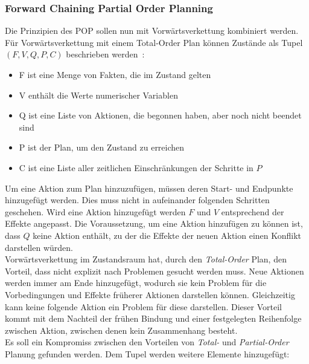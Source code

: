 \subsubsection{Forward Chaining Partial Order Planning}
Die Prinzipien des \ac{POP} sollen nun mit Vorwärtsverkettung kombiniert werden.
Für Vorwärtsverkettung mit einem Total-Order Plan können Zustände als Tupel $(F,V,Q,P,C)$ beschrieben werden~\citep{popf}:
\begin{itemize}
    \item F ist eine Menge von Fakten, die im Zustand gelten
    \item V enthält die Werte numerischer Variablen
    \item Q ist eine Liste von Aktionen, die begonnen haben, aber noch nicht beendet sind
    \item P ist der Plan, um den Zustand zu erreichen
    \item C ist eine Liste aller zeitlichen Einschränkungen der Schritte in $P$
\end{itemize}
Um eine Aktion zum Plan hinzuzufügen, müssen deren Start- und Endpunkte hinzugefügt werden.
Dies muss nicht in aufeinander folgenden Schritten geschehen.
Wird eine Aktion hinzugefügt werden $F$ und $V$ entsprechend der Effekte angepasst.
Die Voraussetzung, um eine Aktion hinzufügen zu können ist, dass $Q$ keine Aktion enthält, zu der die Effekte der neuen Aktion einen Konflikt darstellen würden.\\
Vorwärtsverkettung im Zustandsraum hat, durch den \emph{Total-Order} Plan, den Vorteil, dass nicht explizit nach Problemen gesucht werden muss.
Neue Aktionen werden immer am Ende hinzugefügt, wodurch sie kein Problem für die Vorbedingungen und Effekte früherer Aktionen darstellen können.
Gleichzeitig kann keine folgende Aktion ein Problem für diese darstellen.
Dieser Vorteil kommt mit dem Nachteil der frühen Bindung und einer festgelegten Reihenfolge zwischen Aktion, zwischen denen kein Zusammenhang besteht.\\
Es soll ein Kompromiss zwischen den Vorteilen von \emph{Total-} und \emph{Partial-Order} Planung gefunden werden.
Dem Tupel werden weitere Elemente hinzugefügt:

